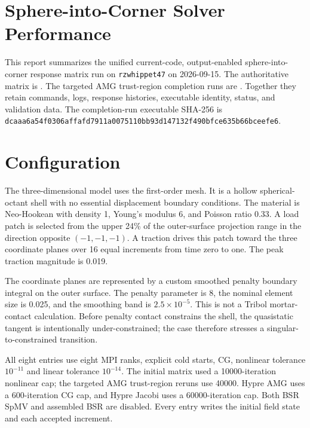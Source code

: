 \documentclass[11pt]{article}
\begin{document}
\sloppy

\section*{Sphere-into-Corner Solver Performance}

This report summarizes the unified current-code, output-enabled
sphere-into-corner response matrix run on \texttt{rzwhippet47} on 2026-09-15.
The authoritative matrix is
.
The targeted AMG trust-region completion runs are
.
Together they retain commands, logs, response histories, executable identity,
status, and validation data.  The completion-run executable SHA-256 is
\texttt{dcaaa6a54f0306affafd7911a0075110bb93d147132f490bfce635b66bceefe6}.

\section*{Configuration}

The three-dimensional model uses the first-order
 mesh.  It is a hollow spherical-octant
shell with no essential displacement boundary conditions.  The material is
Neo-Hookean with density 1, Young's modulus 6, and Poisson ratio 0.33.  A load
patch is selected from the upper 24\% of the outer-surface projection range in
the direction opposite $(-1,-1,-1)$.  A traction drives this patch toward the
three coordinate planes over 16 equal increments from time zero to one.  The
peak traction magnitude is 0.019.

The coordinate planes are represented by a custom smoothed penalty boundary
integral on the outer surface.  The penalty parameter is 8, the nominal element
size is 0.025, and the smoothing band is $2.5\times10^{-5}$.  This is not a
Tribol mortar-contact calculation.  Before penalty contact constrains the
shell, the quasistatic tangent is intentionally under-constrained; the case
therefore stresses a singular-to-constrained transition.

All eight entries use eight MPI ranks, explicit cold starts, CG, nonlinear
tolerance $10^{-11}$ and linear tolerance $10^{-14}$. The initial matrix used a
10000-iteration nonlinear cap; the targeted AMG trust-region reruns use 40000.
Hypre AMG uses a 600-iteration CG cap, and Hypre Jacobi uses a
60000-iteration cap.  Both BSR SpMV and assembled BSR are disabled.  Every
entry writes the initial field state and each accepted increment.
\end{document}
